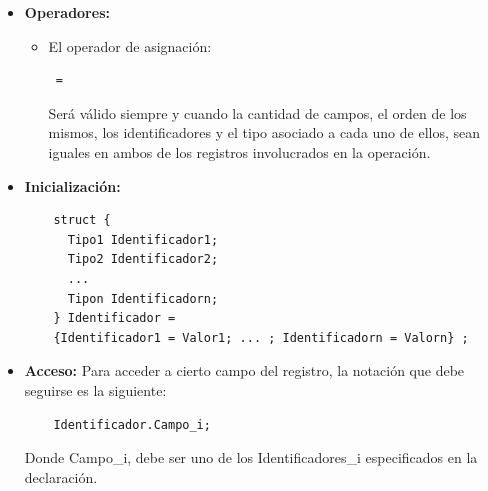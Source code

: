 \documentclass[11pt, spanish]{report}
\begin{document}
\begin{itemize}
  Claro \'esta que en este ejemplo no va de acuerdo al lenguaje ya que los booleanos van a ocupar 8 bytes. Simplemente la idea era reflejar lo que es 
  compactaci\'on.
  Se escogi\'o este tipo de almacenamiento porque a pesar de que se pierde memoria, se gana eficiencia en el programa.\\

\item \textbf{Operadores:}
  \begin{itemize}
  \item El operador de asignaci\'on:
    \begin{verbatim} = \end{verbatim}
    Ser\'a v\'alido siempre y cuando la cantidad de campos, el orden de los mismos, los identificadores y el tipo asociado a cada uno de ellos, sean iguales en ambos de los registros involucrados en la operaci\'on. 
  \end{itemize}
\item \textbf{Inicializaci\'on:}
  \begin{verbatim}
    struct {
      Tipo1 Identificador1;
      Tipo2 Identificador2;
      ...
      Tipon Identificadorn;
    } Identificador = 
    {Identificador1 = Valor1; ... ; Identificadorn = Valorn} ;
  \end{verbatim}
\item \textbf{Acceso:}
  Para acceder a cierto campo del registro, la notaci\'on que debe seguirse es la siguiente:
  \begin{verbatim}
    Identificador.Campo_i;
  \end{verbatim}

  Donde Campo\_i, debe ser uno de los Identificadores\_i especificados en la declaraci\'on.
\end{itemize}
\end{document}
